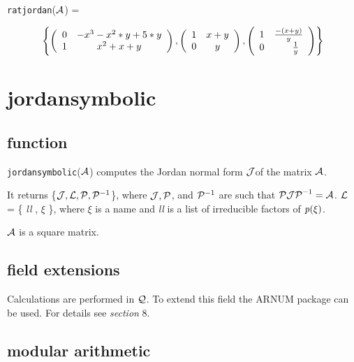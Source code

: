 {\tt ratjordan}(${\cal A}$) = 
\begin{center}
\begin{displaymath}
\left\{ \left( \begin{array}{cc} 0 & -x^3-x^2*y+5*y \\ 1 & 
x^2+x+y \end{array} \right), \left( \begin{array}{cc}
1 & x+y \\ 0 & y \end{array} \right), \left( \begin{array}{cc} 1 & 
\frac{-(x+y)}{y} \\ 0 & \hspace{0.2in} \frac{1}{y} \end{array} \right) 
\right\}
\end{displaymath}
\end{center}


\section{jordansymbolic}

\subsection{function}

{\tt jordansymbolic}(${\cal A}$) \hspace{0in} computes the Jordan 
normal form ${\cal J}$of the matrix ${\cal A}$.

It returns \{${\cal J}, {\cal L}, {\cal P}, {\cal P}^{-1}$\}, where 
${\cal J}, {\cal P}$, and ${\cal P}^{-1}$ are such that ${\cal P J P}^
{-1} = {\cal A}$. ${\cal L}$ = \{ {\it ll} , $\xi$ \}, where $\xi$ is 
a name and {\it ll} is a list of irreducible factors of ${\it p}(\xi)$.

${\cal A}$ is a square matrix.

\subsection{field extensions}

Calculations are performed in ${\cal Q}$. To extend this field the 
{\small ARNUM} package can be used. For details see {\it section} 8.

\subsection{modular arithmetic}

